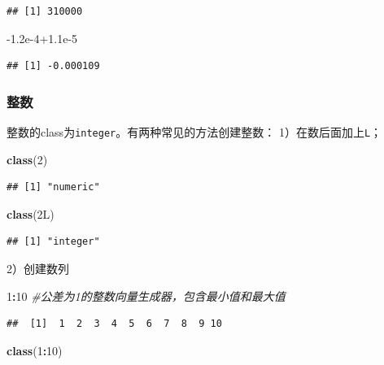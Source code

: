 \documentclass[]{book}
\newenvironment{Shaded}{\begin{snugshade}}{\end{snugshade}}
\newcommand{\CommentTok}[1]{\textcolor[rgb]{0.56,0.35,0.01}{\textit{#1}}}
\newcommand{\DecValTok}[1]{\textcolor[rgb]{0.00,0.00,0.81}{#1}}
\newcommand{\FloatTok}[1]{\textcolor[rgb]{0.00,0.00,0.81}{#1}}
\newcommand{\KeywordTok}[1]{\textcolor[rgb]{0.13,0.29,0.53}{\textbf{#1}}}
\newcommand{\NormalTok}[1]{#1}
\newcommand{\OperatorTok}[1]{\textcolor[rgb]{0.81,0.36,0.00}{\textbf{#1}}}
\begin{document}
\begin{verbatim}
## [1] 310000
\end{verbatim}

\begin{Shaded}
\begin{Highlighting}[]
\FloatTok{-1.2e-4+1.1e-5}
\end{Highlighting}
\end{Shaded}

\begin{verbatim}
## [1] -0.000109
\end{verbatim}

\subsubsection{整数}

整数的class为\texttt{integer}。有两种常见的方法创建整数：
1）在数后面加上\texttt{L}；

\begin{Shaded}
\begin{Highlighting}[]
\KeywordTok{class}\NormalTok{(}\DecValTok{2}\NormalTok{)}
\end{Highlighting}
\end{Shaded}

\begin{verbatim}
## [1] "numeric"
\end{verbatim}

\begin{Shaded}
\begin{Highlighting}[]
\KeywordTok{class}\NormalTok{(2L)}
\end{Highlighting}
\end{Shaded}

\begin{verbatim}
## [1] "integer"
\end{verbatim}

2）创建数列

\begin{Shaded}
\begin{Highlighting}[]
\DecValTok{1}\OperatorTok{:}\DecValTok{10} \CommentTok{#公差为1的整数向量生成器，包含最小值和最大值}
\end{Highlighting}
\end{Shaded}

\begin{verbatim}
##  [1]  1  2  3  4  5  6  7  8  9 10
\end{verbatim}

\begin{Shaded}
\begin{Highlighting}[]
\KeywordTok{class}\NormalTok{(}\DecValTok{1}\OperatorTok{:}\DecValTok{10}\NormalTok{)}
\end{Highlighting}
\end{Shaded}
\end{document}
